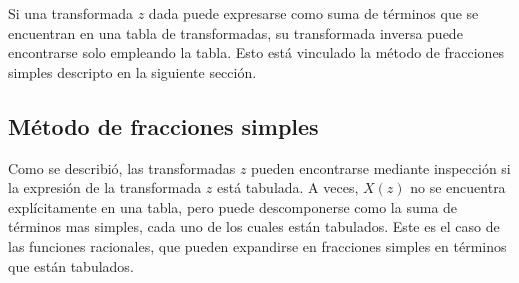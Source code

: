 \documentclass[a4paper]{report}
\begin{document}
Si una transformada \(z\) dada puede expresarse como suma de términos que se encuentran en una tabla de transformadas, su transformada inversa puede encontrarse solo empleando la tabla. Esto está vinculado la método de fracciones simples descripto en la siguiente sección. 
 
\subsection{Método de fracciones simples} 
 
Como se describió, las transformadas \(z\) pueden encontrarse mediante inspección si la expresión de la transformada \(z\) está tabulada. A veces, \(X(z)\) no se encuentra explícitamente en una tabla, pero puede descomponerse como la suma de términos mas simples, cada uno de los cuales están tabulados. Este es el caso de las funciones racionales, que pueden expandirse en fracciones simples en términos que están tabulados. 
\end{document}
